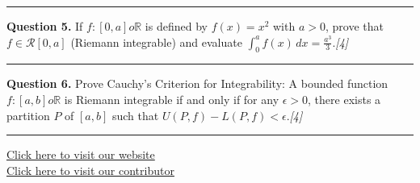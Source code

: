 \documentclass[11pt,a4paper]{article}
\newcommand{\pts}[1]{\hfill   \textit{[#1]}}
\begin{document}
\medskip\rule{\linewidth}{0.2pt}\medskip




\noindent   \textbf{Question 5.} If $f \colon [0, a]  o \mathbb{R}$ is defined by $f(x) = x^2$ with $a > 0$, prove that $f \in \mathcal{R}[0, a]$ (Riemann integrable) and evaluate $\int_0^a f(x) \, dx = \frac{a^3}{3}$.\pts{4}

\medskip\rule{\linewidth}{0.2pt}\medskip




\noindent   \textbf{Question 6.} Prove Cauchy's Criterion for Integrability: A bounded function $f \colon [a, b]  o \mathbb{R}$ is Riemann integrable if and only if for any $\epsilon > 0$, there exists a partition $P$ of $[a, b]$ such that $U(P, f) - L(P, f) < \epsilon$.\pts{4}

\vfill
\rule{\linewidth}{0.4pt}

\begin{center}\small
\href{https://bhu-exam.vercel.app/}{Click here to visit our website}\\[4pt]
\href{https://me-aryan.vercel.app/}{Click here to visit our contributor}
\end{center}
\end{document}
